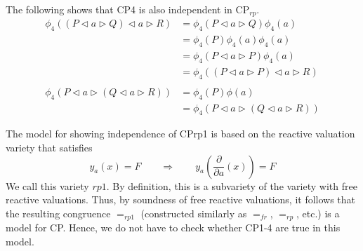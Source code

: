 \documentclass[a4paper,twoside,openright]{report}
\newcommand{\dd}[1]{\frac{\partial}{\partial #1}}
\newcommand{\lef}{\ensuremath{\triangleleft}}
\newcommand{\rig}{\ensuremath{\triangleright}}
\begin{document}
The following shows that CP4 is also independent in $\text{CP}_{rp}$.
\begin{align*}
\phi_4((P\lef a\rig Q)\lef a\rig R)
&= \phi_4(P\lef a\rig Q)\phi_4(a)\\
&= \phi_4(P)\phi_4(a)\phi_4(a)\\
&= \phi_4(P\lef a\rig P)\phi_4(a)\\
&= \phi_4((P\lef a\rig P)\lef a\rig R)\\\\
\phi_4(P\lef a\rig(Q\lef a\rig R))
&= \phi_4(P)\phi(a)\\
&= \phi_4(P\lef a\rig(Q\lef a\rig R))
\end{align*}

The model for showing independence of CPrp1 is based on the reactive valuation variety that satisfies
\[
y_a(x)=F\qquad\Longrightarrow\qquad y_a(\dd a(x))=F
\]
We call this variety $rp1$. By definition, this is a subvariety of the variety with free reactive valuations. Thus, by soundness of free reactive valuations, it follows that the resulting congruence $=_{rp1}$ (constructed similarly as $=_{fr}$, $=_{rp}$, etc.) is a model for CP. Hence, we do not have to check whether CP1-4 are true in this model.
\end{document}
